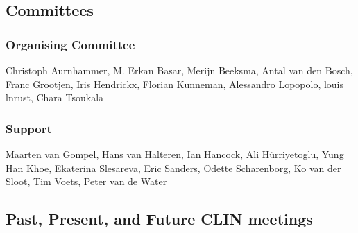 \subsection{Committees}


\subsubsection{Organising Committee}
Christoph Aurnhammer, M. Erkan Basar, Merijn Beeksma, Antal van den Bosch, Franc Grootjen, Iris Hendrickx, Florian Kunneman, Alessandro Lopopolo, louis lnrust, Chara Tsoukala

\subsubsection{Support}
Maarten van Gompel, Hans van Halteren, Ian Hancock, Ali Hürriyetoglu, Yung Han Khoe, Ekaterina Slesareva, Eric Sanders, Odette Scharenborg, Ko van der Sloot, Tim Voets, Peter van de Water 


\subsection{Past, Present, and Future CLIN meetings}
